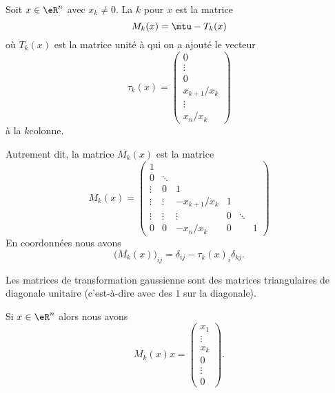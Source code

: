 \begin{definition}		\label{DEFooOJRKooDcrbeU}
	Soit \( x\in \eR^n\) avec \( x_k\neq 0\). La \( k\)\ieme {} pour \( x\) est la matrice
	\begin{equation}
		M_k(x)=\mtu-T_k(x)
	\end{equation}
	où \( T_k(x)\) est la matrice unité à qui on a ajouté le vecteur
	\begin{equation}
		\tau_k(x)=
		\begin{pmatrix}
			0           \\
			\vdots      \\
			0           \\
			x_{k+1}/x_k \\
			\vdots      \\
			x_n/x_k
		\end{pmatrix}
	\end{equation}
	à la \( k\)\ieme colonne.
\end{definition}
Autrement dit, la matrice \( M_k(x)\) est la matrice
\begin{equation}        \label{EQooMWXLooBDtsKS}
	M_k(x)=\begin{pmatrix}
		1      &        &              &   &        &   \\
		0      & \ddots &              &   &        &   \\
		\vdots & 0      & 1            &   &        &   \\
		\vdots & \vdots & -x_{k+1}/x_k & 1 &        &   \\
		\vdots & \vdots & \vdots       & 0 & \ddots &   \\
		0      & 0      & -x_n/x_k     & 0 &        & 1
	\end{pmatrix}
\end{equation}
En coordonnées nous avons
\begin{equation}
	\big( M_k(x)\big)_{ij}=\delta_{ij}-\tau_k(x)_i\delta_{kj}.
\end{equation}

\begin{normaltext}
	Les matrices de transformation gaussienne sont des matrices triangulaires de diagonale unitaire (c'est-à-dire avec des \( 1\) sur la diagonale).
\end{normaltext}

\begin{lemma}
	Si \( x\in \eR^n\) alors nous avons
	\begin{equation}
		M_k(x)x=\begin{pmatrix}
			x_1    \\
			\vdots \\
			x_k    \\
			0      \\
			\vdots \\
			0
		\end{pmatrix}.
	\end{equation}
\end{lemma}

